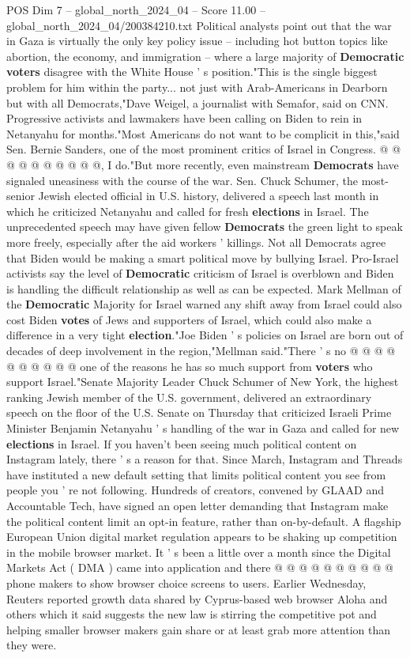 \begin{textsample}{POS Dim 7 – global\_north\_2024\_04 – Score 11.00 – global\_north\_2024\_04/200384210.txt}
Political analysts point out that the war in Gaza is virtually the only key policy issue -- including hot button topics like abortion, the economy, and immigration -- where a large majority of \textbf{Democratic} \textbf{voters} disagree with the White House ' s position."This is the single biggest problem for him within the party... not just with Arab-Americans in Dearborn but with all Democrats,"Dave Weigel, a journalist with Semafor, said on CNN.
Progressive activists and lawmakers have been calling on Biden to rein in Netanyahu for months."Most Americans do not want to be complicit in this,"said Sen.
Bernie Sanders, one of the most prominent critics of Israel in Congress. @ @ @ @ @ @ @ @ @ @, I do."But more recently, even mainstream \textbf{Democrats} have signaled uneasiness with the course of the war.
Sen.
Chuck Schumer, the most-senior Jewish elected official in U.S. history, delivered a speech last month in which he criticized Netanyahu and called for fresh \textbf{elections} in Israel.
The unprecedented speech may have given fellow \textbf{Democrats} the green light to speak more freely, especially after the aid workers ' killings.
Not all Democrats agree that Biden would be making a smart political move by bullying Israel.
Pro-Israel activists say the level of \textbf{Democratic} criticism of Israel is overblown and Biden is handling the difficult relationship as well as can be expected.
Mark Mellman of the \textbf{Democratic} Majority for Israel warned any shift away from Israel could also cost Biden \textbf{votes} of Jews and supporters of Israel, which could also make a difference in a very tight \textbf{election}."Joe Biden ' s policies on Israel are born out of decades of deep involvement in the region,"Mellman said."There ' s no @ @ @ @ @ @ @ @ @ @ one of the reasons he has so much support from \textbf{voters} who support Israel."Senate Majority Leader Chuck Schumer of New York, the highest ranking Jewish member of the U.S. government, delivered an extraordinary speech on the floor of the U.S.
Senate on Thursday that criticized Israeli Prime Minister Benjamin Netanyahu ' s handling of the war in Gaza and called for new \textbf{elections} in Israel.
If you haven't been seeing much political content on Instagram lately, there ' s a reason for that.
Since March, Instagram and Threads have instituted a new default setting that limits political content you see from people you ' re not following.
Hundreds of creators, convened by GLAAD and Accountable Tech, have signed an open letter demanding that Instagram make the political content limit an opt-in feature, rather than on-by-default.
A flagship European Union digital market regulation appears to be shaking up competition in the mobile browser market.
It ' s been a little over a month since the Digital Markets Act ( DMA ) came into application and there @ @ @ @ @ @ @ @ @ @ phone makers to show browser choice screens to users.
Earlier Wednesday, Reuters reported growth data shared by Cyprus-based web browser Aloha and others which it said suggests the new law is stirring the competitive pot and helping smaller browser makers gain share or at least grab more attention than they were.


\end{textsample}

